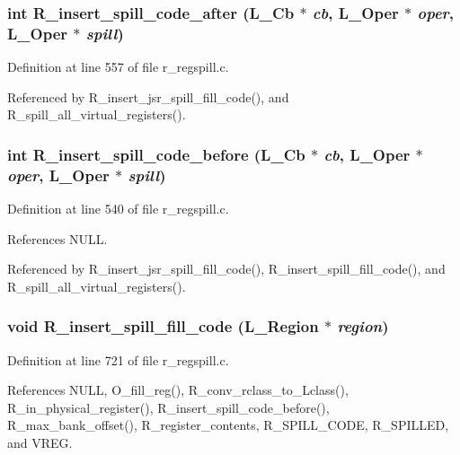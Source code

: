 \subsubsection{\setlength{\rightskip}{0pt plus 5cm}int R\_\-insert\_\-spill\_\-code\_\-after (L\_\-Cb $\ast$ {\em cb}, L\_\-Oper $\ast$ {\em oper}, L\_\-Oper $\ast$ {\em spill})}\label{r__regproto_8h_0f3f5aec000f08fc43f41acf49f12abd}




Definition at line 557 of file r\_\-regspill.c.

Referenced by R\_\-insert\_\-jsr\_\-spill\_\-fill\_\-code(), and R\_\-spill\_\-all\_\-virtual\_\-registers().
\subsubsection{\setlength{\rightskip}{0pt plus 5cm}int R\_\-insert\_\-spill\_\-code\_\-before (L\_\-Cb $\ast$ {\em cb}, L\_\-Oper $\ast$ {\em oper}, L\_\-Oper $\ast$ {\em spill})}\label{r__regproto_8h_1db85fe134ec9b6246968d8aed301d5c}




Definition at line 540 of file r\_\-regspill.c.

References NULL.

Referenced by R\_\-insert\_\-jsr\_\-spill\_\-fill\_\-code(), R\_\-insert\_\-spill\_\-fill\_\-code(), and R\_\-spill\_\-all\_\-virtual\_\-registers().
\subsubsection{\setlength{\rightskip}{0pt plus 5cm}void R\_\-insert\_\-spill\_\-fill\_\-code (L\_\-Region $\ast$ {\em region})}\label{r__regproto_8h_333b12c97f89b00c2e5f48150f08dbeb}




Definition at line 721 of file r\_\-regspill.c.

References NULL, O\_\-fill\_\-reg(), R\_\-conv\_\-rclass\_\-to\_\-Lclass(), R\_\-in\_\-physical\_\-register(), R\_\-insert\_\-spill\_\-code\_\-before(), R\_\-max\_\-bank\_\-offset(), R\_\-register\_\-contents, R\_\-SPILL\_\-CODE, R\_\-SPILLED, and VREG.

